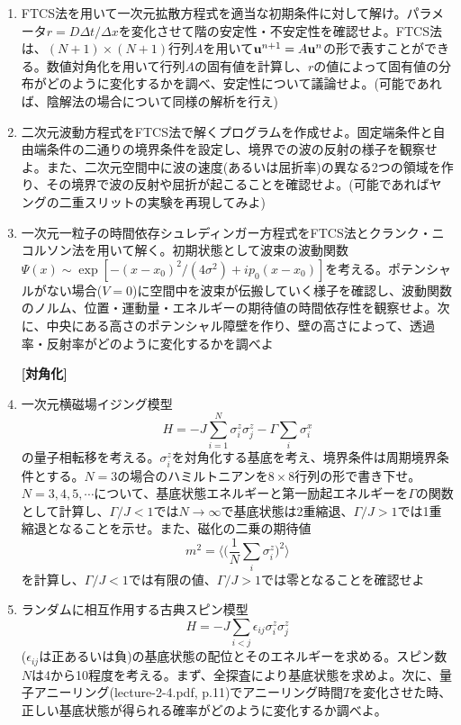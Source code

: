 \documentclass[11pt]{jarticle}
\begin{document}
\begin{enumerate}
\item FTCS法を用いて一次元拡散方程式を適当な初期条件に対して解け。パラメータ$r=D\Delta t / \Delta x$を変化させて階の安定性・不安定性を確認せよ。FTCS法は、$(N+1) \times (N+1)$行列$A$を用いて${\bf u}^{n+1} = A {\bf u}^n$の形で表すことができる。数値対角化を用いて行列$A$の固有値を計算し、$r$の値によって固有値の分布がどのように変化するかを調べ、安定性について議論せよ。(可能であれば、陰解法の場合について同様の解析を行え)

\item 二次元波動方程式をFTCS法で解くプログラムを作成せよ。固定端条件と自由端条件の二通りの境界条件を設定し、境界での波の反射の様子を観察せよ。また、二次元空間中に波の速度(あるいは屈折率)の異なる2つの領域を作り、その境界で波の反射や屈折が起こることを確認せよ。(可能であればヤングの二重スリットの実験を再現してみよ)

\item 一次元一粒子の時間依存シュレディンガー方程式をFTCS法とクランク・ニコルソン法を用いて解く。初期状態として波束の波動関数$\Psi(x) \sim \exp [-(x-x_0)^2/(4\sigma^2) + i p_0(x-x_0)]$を考える。ポテンシャルがない場合($V=0$)に空間中を波束が伝搬していく様子を確認し、波動関数のノルム、位置・運動量・エネルギーの期待値の時間依存性を観察せよ。次に、中央にある高さのポテンシャル障壁を作り、壁の高さによって、透過率・反射率がどのように変化するかを調べよ
  
\hspace*{-2em} {\bf [対角化]}

\item 一次元横磁場イジング模型
  \[
  H = - J\sum_{i=1}^N \sigma_i^z \sigma_j^z - \Gamma \sum_i \sigma_i^x
  \]
  の量子相転移を考える。$\sigma_i^z$を対角化する基底を考え、境界条件は周期境界条件とする。$N=3$の場合のハミルトニアンを$8\times8$行列の形で書き下せ。$N=3,4,5,\cdots$について、基底状態エネルギーと第一励起エネルギーを$\Gamma$の関数として計算し、$\Gamma/J < 1$では$N \rightarrow \infty$で基底状態は2重縮退、$\Gamma/J > 1$では1重縮退となることを示せ。また、磁化の二乗の期待値
  \[
  m^2 = \langle \Big( \frac{1}{N} \sum_i \sigma_i^z \Big)^2 \rangle
  \]
  を計算し、$\Gamma/J < 1$では有限の値、$\Gamma/J > 1$では零となることを確認せよ

\item ランダムに相互作用する古典スピン模型
  \[
  H = -J \sum_{i<j} \epsilon_{ij} \sigma_i^z \sigma_j^z
  \]
  ($\epsilon_{ij}$は正あるいは負)の基底状態の配位とそのエネルギーを求める。スピン数$N$は4から10程度を考える。まず、全探査により基底状態を求めよ。次に、量子アニーリング(lecture-2-4.pdf, p.11)でアニーリング時間$T$を変化させた時、正しい基底状態が得られる確率がどのように変化するか調べよ。


\end{enumerate}
\end{document}
